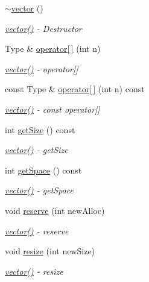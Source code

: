 \begin{DoxyCompactItemize}
\hyperlink{classvector_af6ca21dc63ee5974d306c5c4ad104294}{$\sim$vector} ()
\begin{DoxyCompactList}\small\item\em \hyperlink{classvector_ab8d8ebaa9b91a05bb7a94371cb84c042}{vector()} -\/ Destructor \end{DoxyCompactList}\item 
Type \& \hyperlink{classvector_ae7389576636ca0117a731ed2626ac747}{operator\mbox{[}$\,$\mbox{]}} (int n)
\begin{DoxyCompactList}\small\item\em \hyperlink{classvector_ab8d8ebaa9b91a05bb7a94371cb84c042}{vector()} -\/ operator\mbox{[}\mbox{]} \end{DoxyCompactList}\item 
const Type \& \hyperlink{classvector_ae7ec6942e0a373dc03c99796ce3555eb}{operator\mbox{[}$\,$\mbox{]}} (int n) const
\begin{DoxyCompactList}\small\item\em \hyperlink{classvector_ab8d8ebaa9b91a05bb7a94371cb84c042}{vector()} -\/ const operator\mbox{[}\mbox{]} \end{DoxyCompactList}\item 
int \hyperlink{classvector_a0c650d6f1411947dc6a407c4adde5109}{get\+Size} () const
\begin{DoxyCompactList}\small\item\em \hyperlink{classvector_ab8d8ebaa9b91a05bb7a94371cb84c042}{vector()} -\/ get\+Size \end{DoxyCompactList}\item 
int \hyperlink{classvector_a9f64c11bb3348e2d1c5c4f41ae15780f}{get\+Space} () const
\begin{DoxyCompactList}\small\item\em \hyperlink{classvector_ab8d8ebaa9b91a05bb7a94371cb84c042}{vector()} -\/ get\+Space \end{DoxyCompactList}\item 
void \hyperlink{classvector_acb1ede35cda295c9e1729ca981d39e09}{reserve} (int new\+Alloc)
\begin{DoxyCompactList}\small\item\em \hyperlink{classvector_ab8d8ebaa9b91a05bb7a94371cb84c042}{vector()} -\/ reserve \end{DoxyCompactList}\item 
void \hyperlink{classvector_a3e51ccc704255ec4acfed8e3d5c7be7f}{resize} (int new\+Size)
\begin{DoxyCompactList}\small\item\em \hyperlink{classvector_ab8d8ebaa9b91a05bb7a94371cb84c042}{vector()} -\/ resize \end{DoxyCompactList}\item 

\end{DoxyCompactItemize}
